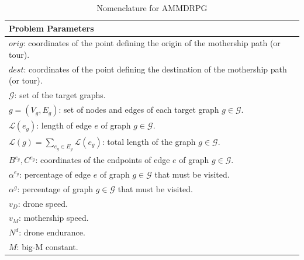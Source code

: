  \begin{table}[!h]
\scriptsize
\centering
\begin{tabular}{ | l | }
\hline
\textbf{Problem Parameters}\\
\hline
$orig$: coordinates of the point defining the origin of the mothership path (or tour).\\
$dest$: coordinates of the point defining the destination of the mothership path (or tour).\\
$\mathcal{G}$: set of the target graphs.\\
$g = (V_g, E_g)$: set of nodes and edges of each target graph $g \in \mathcal{G}$.\\
$\mathcal{L}(e_g)$: length of edge $e$ of graph $g \in \mathcal{G}$.\\
$\mathcal{L}(g)=\sum_{e_g\in E_g} \mathcal L(e_g)$: total length of the graph $g\in\mathcal G$.\\
$B^{e_g}, C^{e_g}$: coordinates of the endpoints of edge $e$ of graph $g \in \mathcal{G}$.\\
$\alpha^{e_g}$: percentage of edge $e$ of graph $g \in \mathcal{G}$ that must be visited.\\
$\alpha^{g}$: percentage of graph $g \in \mathcal{G}$ that must be visited.\\
$v_D$: drone speed.\\
$v_M$: mothership speed.\\
$N^d$: drone endurance. \\
$M$: big-M constant.\\
\hline
\end{tabular}
\caption{Nomenclature for AMMDRPG}
\label{table:t1}
\end{table}

